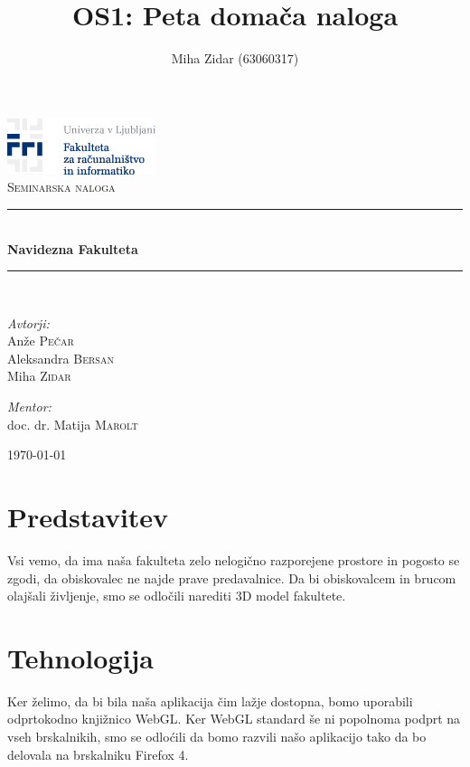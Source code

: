 \documentclass[10pt,a4paper]{article}
\author{Miha Zidar (63060317)}
\title{OS1: Peta domača naloga}
\begin{document}
\begin{titlepage}
\begin{center}

\includegraphics{Screenshot.png}\\[5.0cm]    
\textsc{\Large Seminarska naloga}\\[1.5cm]

\hrule \ \\[0.2cm]
{ \huge \bfseries Navidezna Fakulteta}\\[0.5cm]
\hrule \ \\[2.5cm]

\begin{minipage}{0.4\textwidth}
\begin{flushleft} \large
\emph{Avtorji:}\\
Anže \textsc{Pečar}\\
Aleksandra \textsc{Bersan}\\
Miha \textsc{Zidar}\\
\end{flushleft}
\end{minipage}
\begin{minipage}{0.4\textwidth}
\begin{flushright} \large
\emph{Mentor:} \\
doc. dr. Matija \textsc{Marolt}\\
\end{flushright}
\end{minipage}
\vfill

{\large \today}

\end{center}
\end{titlepage}


\section{Predstavitev}
Vsi vemo, da ima naša fakulteta zelo nelogično razporejene prostore in pogosto se zgodi, da obiskovalec ne najde prave predavalnice. Da bi obiskovalcem in brucom olajšali življenje, smo se odločili narediti 3D model fakultete.
\section{Tehnologija}
Ker želimo, da bi bila naša aplikacija čim lažje dostopna, bomo uporabili odprtokodno knjižnico WebGL. Ker WebGL standard še ni popolnoma podprt na vseh brskalnikih, smo se odloćili da bomo razvili našo aplikacijo tako da bo delovala na brskalniku Firefox 4.
\end{document}
